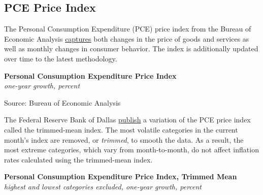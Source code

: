 \documentclass{report}
\makeatletter
\newcommand{\tbllink}[1]{\href{https://raw.githubusercontent.com/bdecon/US-chartbook/master/chartbook/data/#1}{\faTable}}
\newcommand*\short[1]{\expandafter\@gobbletwo\number\numexpr#1\relax}
\newcommand{\dateaxisticks}{
		date coordinates in=x, axis line style={draw=none},
		xmax={2023-10-01},
		max space between ticks=40,	    
		xtick={{1990-01-01}, {1992-01-01}, {1994-01-01}, 
			{1996-01-01}, {1998-01-01}, {2000-01-01}, 
			{2002-01-01}, {2004-01-01}, {2006-01-01},
			{2008-01-01}, {2010-01-01}, {2012-01-01}, {2014-01-01},
		    {2016-01-01}, {2018-01-01}, {2020-01-01}, {2022-01-01}, 
		    {2024-01-01}, {2026-01-01}},
		minor xtick={{1989-01-01}, {1991-01-01}, {1993-01-01},
			{1995-01-01}, {1997-01-01}, {1999-01-01}, 
			{2001-01-01}, {2003-01-01}, {2005-01-01}, {2007-01-01},
		    {2009-01-01}, {2011-01-01}, {2013-01-01}, {2015-01-01},
		    {2017-01-01}, {2019-01-01}, {2021-01-01}, {2023-01-01}, 
		    {2025-01-01}, {2027-01-01}},
		enlarge y limits={0.06}, enlarge x limits={0.01},
		}
\newcommand{\bbar}[2]{extra #1 ticks = {{#2}}, extra #1 tick labels = ,
		extra #1 tick style = {grid=major, grid style={thick, black!25}},}
\newcommand{\stdline}[4]{\addplot[very thick, no markers, color=#1] 
		table [x=#2, y=#3, col sep=comma] {#4};	}
\newcommand{\rbars}{
		\fill[color=black!10] (axis cs:{1990-07-01},\pgfkeysvalueof{/pgfplots/ymin}) rectangle 
			(axis cs:{1991-03-01}, \pgfkeysvalueof{/pgfplots/ymax});
		\fill[color=black!10] (axis cs:{2007-12-01},\pgfkeysvalueof{/pgfplots/ymin}) rectangle 
			(axis cs:{2009-07-01}, \pgfkeysvalueof{/pgfplots/ymax});
		\fill[color=black!10] (axis cs:{2001-03-01},\pgfkeysvalueof{/pgfplots/ymin}) rectangle 
			(axis cs:{2001-11-01}, \pgfkeysvalueof{/pgfplots/ymax});
		\fill[color=black!10] (axis cs:{2020-02-01},\pgfkeysvalueof{/pgfplots/ymin}) rectangle 
			(axis cs:{2020-05-01}, \pgfkeysvalueof{/pgfplots/ymax});}
\makeatother
\begin{document}
{{\begin{minipage}{0.76\textwidth}
\subsection*{PCE Price Index}
\small The Personal Consumption Expenditure (PCE) price index from the Bureau of Economic Analysis \href{https://www.bea.gov/data/personal-consumption-expenditures-price-index}{captures} both changes in the price of goods and services as well as monthly changes in consumer behavior. The index is additionally updated over time to the latest methodology. 


\vspace{1mm}

\normalsize \textbf{Personal Consumption Expenditure Price Index}\\
\footnotesize{\textit{one-year growth, percent}}\\
\vspace{35mm}

\hspace{3mm} 

\footnotesize{Source: Bureau of Economic Analysis} \hfill \tbllink{pce_pi.csv}
\vspace{5mm}

\small The Federal Reserve Bank of Dallas \href{https://www.dallasfed.org/research/pce}{publish} a variation of the PCE price index called the trimmed-mean index. The most volatile categories in the current month's index are removed, or \textit{trimmed}, to smooth the data. As a result, the most extreme categories, which vary from month-to-month, do not affect inflation rates calculated using the trimmed-mean index. 


\vspace{1mm}

\normalsize \textbf{Personal Consumption Expenditure Price Index, Trimmed Mean}\\
\footnotesize{\textit{highest and lowest categories excluded, one-year growth, percent}}\\
\vspace{26mm}


\end{minipage}}}
\end{document}
